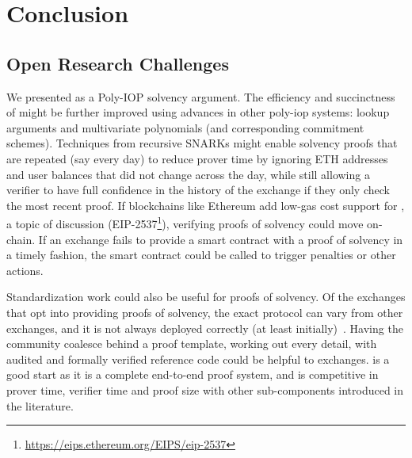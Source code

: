 \chapter{Conclusion}

\section{Open Research Challenges}

We presented \Sys as a Poly-IOP solvency argument. The efficiency and succinctness of \Sys might be further improved using advances in other poly-iop systems: lookup arguments and multivariate polynomials (and corresponding commitment schemes). Techniques from recursive SNARKs might enable solvency proofs that are repeated (say every day) to reduce prover time by ignoring ETH addresses and user balances that did not change across the day, while still allowing a verifier to have full confidence in the history of the exchange if they only check the most recent proof. If blockchains like Ethereum add low-gas cost support for \bls, a topic of discussion (EIP-2537\footnote{\url{https://eips.ethereum.org/EIPS/eip-2537}}), verifying proofs of solvency could move on-chain. If an exchange fails to provide a smart contract with a proof of solvency in a timely fashion, the smart contract could be called to trigger penalties or other actions. 

Standardization work could also be useful for proofs of solvency. Of the exchanges that opt into providing proofs of solvency, the exact protocol can vary from other exchanges, and it is not always deployed correctly (at least initially)~\cite{broken}. Having the community coalesce behind a proof template, working out every detail, with audited and formally verified reference code could be helpful to exchanges. \Sys is a good start as it is a complete end-to-end proof system, and is competitive in prover time, verifier time and proof size with other sub-components introduced in the literature.